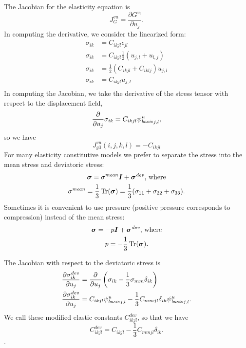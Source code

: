 The Jacobian for the elasticity equation is
\begin{equation}
J_{G}^{vu} = \frac{\partial G^{v_i}}{\partial u_j}.
\end{equation}
In computing the derivative, we consider the linearized form:
\begin{align}
  \sigma_{ik} &= C_{ikjl} \epsilon_{jl} \\
  \sigma_{ik} &= C_{ikjl} \frac{1}{2} ( u_{j,l} + u_{l,j} ) \\
  \sigma_{ik} &= \frac{1}{2} ( C_{ikjl} + C_{iklj} ) u_{j,l} \\
  \sigma_{ik} &= C_{ikjl} u_{j,l} \\
\end{align}
In computing the Jacobian, we take the derivative of the stress tensor with respect to the 
displacement field,
\begin{equation}
  \frac{\partial}{\partial u_j} \sigma_{ik} = C_{ikjl} \basisscalar[u]_{j,l},
\end{equation}
so we have
\begin{equation}
\boxed{
  J_{g3}^{vu}(i,j,k,l) = -C_{ikjl}
}
\end{equation}
For many elasticity constitutive models we prefer to separate the
stress into the mean stress and deviatoric stress:
\begin{gather}
  \tensor{\sigma} = \sigma^\mathit{mean} \tensor{I} + \tensor{\sigma}^\mathit{dev} \text{, 
where}\\
  \sigma^\mathit{mean} = \frac{1}{3} \Tr(\tensor{\sigma}) = \frac{1}{3} (\sigma_{11} + 
\sigma_{22} + \sigma_{33}).
\end{gather}
Sometimes it is convenient to use pressure (positive pressure corresponds to compression) 
instead of the mean 
stress:
\begin{gather}
  \tensor{\sigma} = -p \tensor{I} + \tensor{\sigma}^\mathit{dev} \text{, where}\\
  p = -\frac{1}{3} \Tr(\tensor{\sigma}).
\end{gather}

The Jacobian with respect to the deviatoric stress is
\begin{align}
  \frac{\partial \sigma^\mathit{dev}_{ik}}{\partial u_j}  &= \frac{\partial}{\partial u_j} 
\left(\sigma_{ik} - 
\frac{1}{3} \sigma_{mm} \delta_{ik} \right) \\
  \frac{\partial \sigma^\mathit{dev}_{ik}}{\partial u_j}  &= C_{ikjl} \basisscalar[u]_{j,l} - 
\frac{1}{3} C_{mmjl} 
\delta_{ik} \basisscalar[u]_{j,l}.
\end{align}
We call these modified elastic constants $C^\mathit{dev}_{ikjl}$, so that we have
\begin{equation}
\boxed{
  C^\mathit{dev}_{ikjl} = C_{ikjl} - \frac{1}{3} C_{mmjl} \delta_{ik}.
}
\end{equation}.

